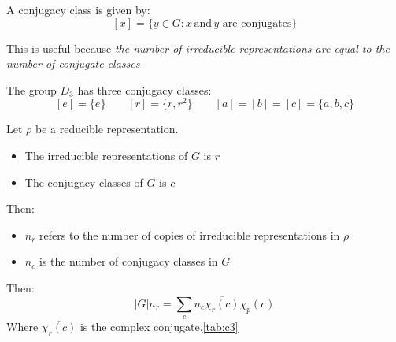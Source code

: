 \documentclass[12pt]{article}
\begin{document}
A conjugacy class is given by:
\[ [x] = \{y \in G : x \,\text{and} \,y \text{ are conjugates}\} \]

This is useful because \textit{the number of irreducible representations are equal to the number of conjugate classes}

The group $D_3$ has three conjugacy classes:
\[ [e] = \{e\} \qquad [r] = \{r,r^2\} \qquad [a]=[b]=[c] = \{a,b,c\}\]

Let $\rho$ be a reducible representation.
\begin{itemize}
    \item The irreducible representations of $G$ is $r$
    \item The conjugacy classes of $G$ is $c$
\end{itemize}
Then:
\begin{itemize}
    \item $n_r$ refers to the number of copies of irreducible representations in $\rho$
    \item $n_c$ is the number of conjugacy classes in $G$
\end{itemize}

Then:
\[|G|n_r = \sum_c n_c \overline{\chi_r(c)}\chi_p(c)\]
Where $\overline{\chi_r(c)}$ is the complex conjugate.\ref{tab:c3}
\end{document}
